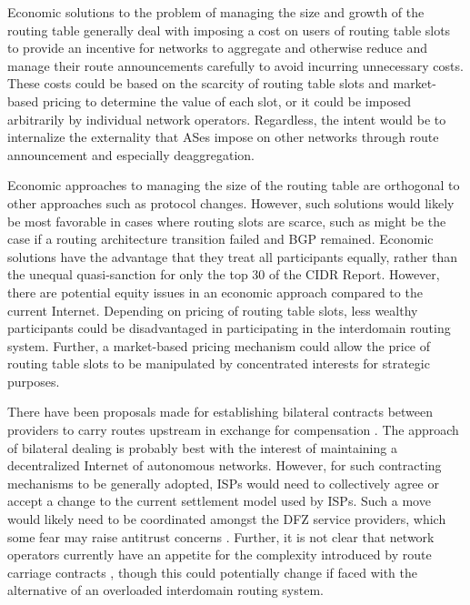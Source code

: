 Economic solutions to the problem of managing the size and growth of the
routing table generally deal with imposing a cost on users of routing table
slots to provide an incentive for networks to aggregate and otherwise reduce
and manage their route announcements carefully to avoid incurring unnecessary
costs. These costs could be based on the scarcity of routing table slots and
market-based pricing to determine the value of each slot, or it could be
imposed arbitrarily by individual network operators. Regardless, the intent
would be to internalize the externality that ASes impose on other networks
through route announcement and especially deaggregation.

Economic approaches to managing the size of the routing table are orthogonal to
other approaches such as protocol changes. However, such solutions would likely
be most favorable in cases where routing slots are scarce, such as might be the
case if a routing architecture transition failed and BGP remained. Economic
solutions have the advantage that they treat all participants equally, rather
than the unequal quasi-sanction for only the top 30 of the CIDR Report.
However, there are potential equity issues in an economic approach compared to
the current Internet. Depending on pricing of routing table slots, less wealthy
participants could be disadvantaged in participating in the interdomain routing
system. Further, a market-based pricing mechanism could allow the price of
routing table slots to be manipulated by concentrated interests for strategic
purposes.

There have been proposals made for establishing bilateral contracts between
providers to carry routes upstream in exchange for compensation
\cite{Rekhter:1997mi}. The approach of bilateral dealing is probably best with
the interest of maintaining a decentralized Internet of autonomous networks.
However, for such contracting mechanisms to be generally adopted, ISPs would
need to collectively agree or accept a change to the current settlement model
used by ISPs. Such a move would likely need to be coordinated amongst the DFZ
service providers, which some fear may raise antitrust concerns
\cite{Li:2011vn}. Further, it is not clear that network operators currently
have an appetite for the complexity introduced by route carriage contracts
\cite{Zhao:2010fu}, though this could potentially change if faced with the
alternative of an overloaded interdomain routing system.


